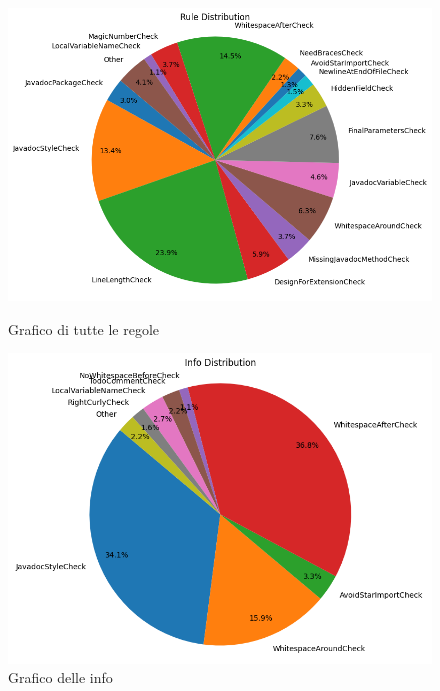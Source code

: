\begin{figure}[H]
	\centering
	\begin{minipage}[b]{1\textwidth}
		\centering
		\includegraphics[width=\textwidth]{iterazione1/images/cucina-error_distribution_pie_chart.png}
		\caption{Grafico di tutte le regole}
		\label{fig:cucina-error_distribution_pie_chart}
	\end{minipage}
	\hfill
	\begin{minipage}[b]{0.45\textwidth}
		\centering
		\includegraphics[width=\textwidth]{iterazione1/images/cucina-info_severity_distribution_pie_chart.png}
		\caption{Grafico delle info}
		\label{fig:cucina-info_severity_distribution_pie_chart}
	\end{minipage}
	\vspace{0.5cm}
	\begin{minipage}[b]{0.45\textwidth}

\end{minipage}
\end{figure}
